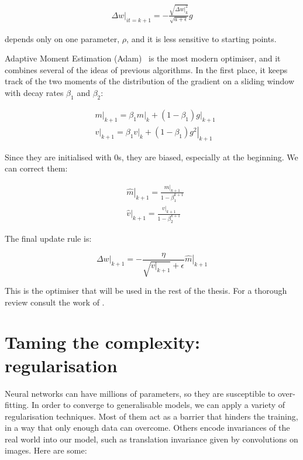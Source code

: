 \begin{align*}
\left.\Delta w\right|_{it=k+1} = - \frac{\sqrt{\left.\Delta w\right|_{k}^2}}{\sqrt{a + \epsilon}}g 
\end{align*}

\ADADELTA{} depends only on one parameter, $\rho$, and it is less sensitive to starting points.

Adaptive Moment Estimation (Adam)~\citep{adam}
is the most modern optimiser, and it combines several of the ideas of previous algorithms.
In the first place, it keeps track of the two moments of the distribution of the gradient on a sliding window with decay rates $\beta_1$ and $\beta_2$:

\begin{align*}
&\left.m\right|_{k+1} = \beta_1 \left.m\right|_k + (1-\beta_1) \left.g\right|_{k+1}\\
&\left.v\right|_{k+1} = \beta_1 \left.v\right|_k + (1-\beta_1) \left.g^2\right|_{k+1}
\end{align*}

Since they are initialised with 0s, they are biased, especially at the beginning. We can correct them:

\begin{align*}
	&\left.\hat{m}\right|_{k+1} = \frac{\left.m\right|_{k+1}}{1-\beta_1^{k+1}}\\
	&\left.\hat{v}\right|_{k+1} = \frac{\left.v\right|_{k+1}}{1-\beta_2^{k+1}}
\end{align*}

The final update rule is:

\begin{equation*}
\left.\Delta w\right|_{k+1} = - \frac{\eta}{\sqrt{\left.v\right|_{k+1}} + \epsilon}\left.\hat{m}\right|_{k+1}
\end{equation*} 

This is the optimiser that will be used in the rest of the thesis.
For a thorough review consult the work of \citet{optimisers_review}.


\section{Taming the complexity: regularisation}
Neural networks can have millions of parameters, so they are susceptible to over-fitting.
In order to converge to generalisable models, we can apply a variety of regularisation techniques.
Most of them act as a barrier that hinders the training, in a way that only enough data can overcome.
Others encode invariances of the real world into our model, such as translation invariance given by convolutions on images.
Here are some:


